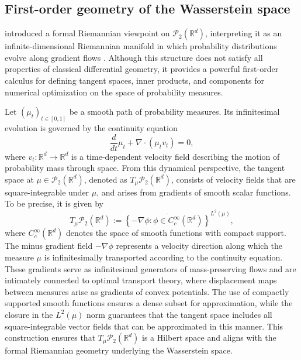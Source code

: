 \documentclass[11pt]{article}
\newcommand{\bbR}{\mathbb{R}}
\newcommand{\calP}{\mathcal{P}}
\begin{document}
\subsection{First-order geometry of the Wasserstein space}
\cite{otto_2001_GeometryDissipativeEvolution} introduced a formal Riemannian viewpoint on $\calP_2(\bbR^d)$, interpreting it as an infinite-dimensional Riemannian manifold in which probability distributions evolve along gradient flows \citep{ambrosio_2005_GradientFlowsMetric}. Although this structure does not satisfy all properties of classical differential geometry, it provides a powerful first-order calculus for defining tangent spaces, inner products, and components for numerical optimization on the space of probability measures. 

Let $(\mu_t)_{t\in [0,1]}$ be a smooth path of probability measures. Its infinitesimal evolution is governed by the continuity equation
\begin{equation*}
    \frac{d}{dt}\mu_t + \nabla \cdot (\mu_t v_t) = 0,
\end{equation*}
where $v_t:\bbR^d \to \bbR^d$ is a time-dependent velocity field describing the motion of probability mass through space. From this dynamical perspective, the tangent space at $\mu \in \calP_2(\bbR^d)$, denoted as $T_\mu \calP_2(\bbR^d)$, consists of velocity fields that are square-integrable under $\mu$, and arises from gradients of smooth scalar functions. To be precise, it is given by 
\begin{equation*}
    T_\mu \calP_2(\bbR^d) := \overline{\left\lbrace -\nabla \phi:\phi \in C_c^\infty(\bbR^d) \right\rbrace}^{L^2(\mu)},
\end{equation*}
where $C_c^\infty(\bbR^d)$ denotes the space of smooth functions with compact support. The minus gradient field $-\nabla \phi$ represents a velocity direction along which the measure $\mu$ is infinitesimally transported according to the continuity equation. These gradients serve as infinitesimal generators of mass-preserving flows and are intimately connected to optimal transport theory, where displacement maps between measures arise as gradients of convex potentials. The use of compactly supported smooth functions ensures a dense subset for approximation, while the closure in the $L^2(\mu)$ norm guarantees that the tangent space includes all square-integrable vector fields that can be approximated in this manner. This construction ensures that $T_\mu \calP_2(\bbR^d)$ is a Hilbert space and aligns with the formal Riemannian geometry underlying the Wasserstein space. 
\end{document}
